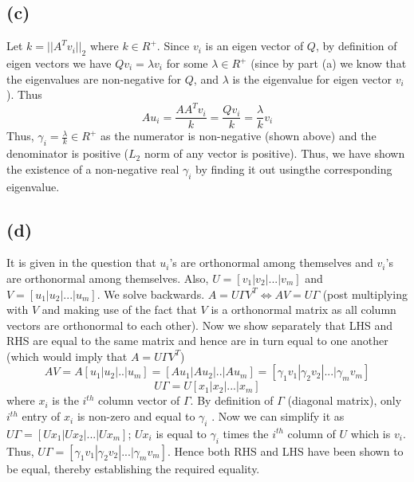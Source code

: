 \documentclass{article}
\begin{document}
\subsection*{(c)} 
Let $k = || A^Tv_i||_2$ where $k \in R^{+}$. Since $v_i$ is an eigen vector of $Q$, by definition of eigen vectors we have $Qv_i = \lambda v_i$ for some $\lambda \in R^{+}$ (since by part (a) we know that the eigenvalues are non-negative for $Q$, and $\lambda$ is the eigenvalue for eigen vector $v_i$). Thus
$$ Au_i = \frac{AA^T v_i}{k} = \frac{Q v_i}{k} = \frac{\lambda}{k}v_i$$
Thus, $\gamma_i = \frac{\lambda}{k} \in R^{+}$ as the numerator is non-negative (shown above) and the denominator is positive ($L_2$ norm of any vector is positive). Thus, we have shown the existence of a non-negative real $\gamma_i$ by finding it out usingthe corresponding eigenvalue. 
\subsection*{(d)} 
It is given in the question that $u_i$'s are orthonormal among themselves and $v_i$'s are orthonormal among themselves. Also, $U = [v_1|v_2|...|v_m]$ and $V = [u_1|u_2|...|u_m]$. We solve backwards.
$A = U\Gamma V^T  \Longleftrightarrow AV = U\Gamma$ (post multiplying with $V$ and making use of the fact that $V$ is a orthonormal matrix as all column vectors are orthonormal to each other). Now we show separately that LHS and RHS are equal to the same matrix and hence are in turn equal to one another (which would imply that $A = U\Gamma V^T$)
$$
AV = A[u_1|u_2|..|u_m] = [Au_1|Au_2|..|Au_m] = [\gamma_1v_1|\gamma_2v_2|...|\gamma_mv_m]
$$
$$
U \Gamma = U[x_1|x_2|...|x_m]
$$ 
where $x_i$ is the $i^{th}$ column vector of $\Gamma$. By definition of $\Gamma$ (diagonal matrix), only $i^{th}$ entry of $x_i$ is non-zero and equal to $\gamma_i$ . Now we can simplify it as $U \Gamma = [Ux_1|Ux_2|...|Ux_m] $; $Ux_i$ is equal to $\gamma_i$ times the $i^{th}$ column of $U$ which is $v_i$. Thus, $U \Gamma = [\gamma_1v_1|\gamma_2v_2|...|\gamma_mv_m]$. Hence both RHS and LHS have been shown to be equal, thereby establishing the required equality.
\\
\end{document}
